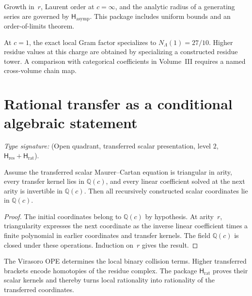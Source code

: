 \begin{remark}
\label{rem:vmp-growth}
Growth in~\(r\), Laurent order at \(c=\infty\), and the analytic
radius of a generating series are governed by
\(\mathsf H_{\mathrm{asymp}}\).  This package includes uniform bounds
and an order-of-limits theorem.
\end{remark}

\begin{remark}
\label{rem:vmp-c1-excluded}
At \(c=1\), the exact local Gram factor specializes to
\(N_\Lambda(1)=27/10\).  Higher residue values at this charge are
obtained by specializing a constructed residue tower.  A comparison
with categorical coefficients in Volume~III requires a named
cross-volume chain map.
\end{remark}

\section{Rational transfer as a conditional algebraic statement}
\label{sec:vmp-transport}

\begin{theorem}
\ClaimStatusConditional
\label{thm:virasoro-riccati-transport-rationality}
\emph{Type signature:}
\textup{(Open quadrant, transferred scalar presentation, level \(2\),
\(\mathsf H_{\mathrm{res}}+\mathsf H_{\mathrm{rat}}\)).}

Assume the transferred scalar Maurer--Cartan equation is triangular in
arity, every transfer kernel lies in \(\mathbb Q(c)\), and every
linear coefficient solved at the next arity is invertible in
\(\mathbb Q(c)\).  Then all recursively constructed scalar
coordinates lie in \(\mathbb Q(c)\).
\end{theorem}

\begin{proof}
The initial coordinates belong to \(\mathbb Q(c)\) by hypothesis.
At arity~\(r\), triangularity expresses the next coordinate as the
inverse linear coefficient times a finite polynomial in earlier
coordinates and transfer kernels.  The field \(\mathbb Q(c)\) is
closed under these operations.  Induction on~\(r\) gives the result.
\end{proof}

\begin{remark}
\label{rem:vmp-binary-bracket-closure}
The Virasoro OPE determines the local binary collision terms.  Higher
transferred brackets encode homotopies of the residue complex.  The
package \(\mathsf H_{\mathrm{rat}}\) proves their scalar kernels and
thereby turns local rationality into rationality of the transferred
coordinates.
\end{remark}

